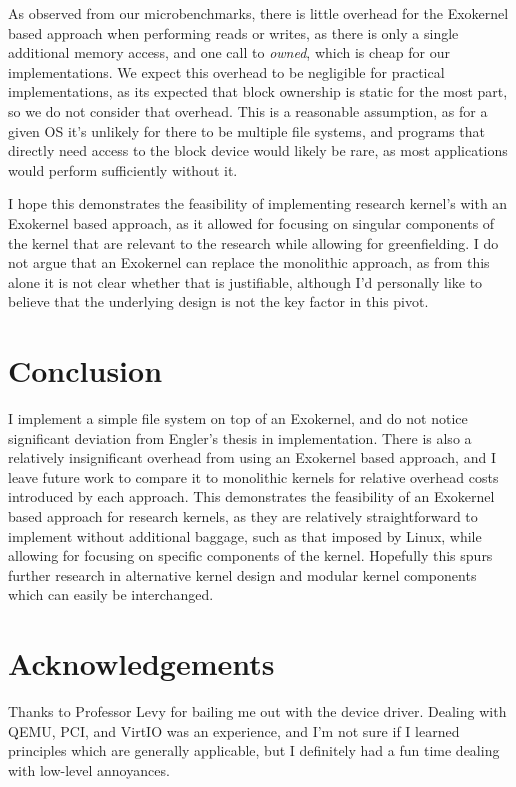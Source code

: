 \documentclass[letterpaper,twocolumn,10pt]{article}
\begin{document}
As observed from our microbenchmarks, there is little overhead for the Exokernel based approach
when performing reads or writes, as there is only a single additional memory access, and one
call to \textit{owned}, which is cheap for our implementations. We expect this overhead to be
negligible for practical implementations, as its expected that block ownership is static for the
most part, so we do not consider that overhead. This is a reasonable assumption, as for a given
OS it's unlikely for there to be multiple file systems, and programs that directly need access
to the block device would likely be rare, as most applications would perform sufficiently
without it.

I hope this demonstrates the feasibility of implementing research kernel's with an Exokernel
based approach, as it allowed for focusing on singular components of the kernel that are
relevant to the research while allowing for greenfielding. I do not argue that an Exokernel can
replace the monolithic approach, as from this alone it is not clear whether that is justifiable,
although I'd personally like to believe that the underlying design is not the key factor in this
pivot.

\section{Conclusion}

I implement a simple file system on top of an Exokernel, and do not notice significant deviation
from Engler's thesis in implementation. There is also a relatively insignificant overhead from
using an Exokernel based approach, and I leave future work to compare it to monolithic kernels
for relative overhead costs introduced by each approach. This demonstrates the feasibility of an
Exokernel based approach for research kernels, as they are relatively straightforward to
implement without additional baggage, such as that imposed by Linux, while allowing for focusing
on specific components of the kernel. Hopefully this spurs further research in alternative
kernel design and modular kernel components which can easily be interchanged.

\section{Acknowledgements}

Thanks to Professor Levy for bailing me out with the device driver. Dealing with QEMU, PCI, and
VirtIO was an experience, and I'm not sure if I learned principles which are generally
applicable, but I definitely had a fun time dealing with low-level annoyances.
\end{document}
